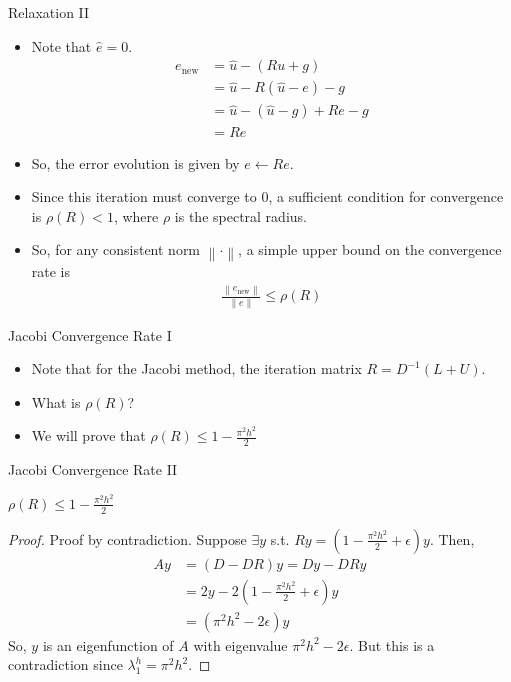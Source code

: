 \documentclass{beamer}
\providecommand{\norm}[1]{\left\lVert #1 \right\rVert}
\begin{document}
\begin{frame}{Relaxation II}
 \begin{itemize}
  \item Note that $\hat{e} = 0$.
  \begin{align}
   e_{\text{new}} &= \hat{u} - (Ru+g) \\
                  &= \hat{u} - R(\hat{u}-e) - g \\
                  &= \hat{u} - (\hat{u}-g) + Re - g \\
                  &= Re
  \end{align}
  \item So, the error evolution is given by $e \leftarrow Re$.
  \item Since this iteration must converge to 0, a sufficient condition for
        convergence is $\rho(R) < 1$, where $\rho$ is the spectral radius.
  \item So, for any consistent norm $\norm{\cdot}$, a simple upper bound on the convergence rate is
  \begin{align}
   \frac{\norm{e_{\text{new}}}}{\norm{e}} \leq \rho(R)
  \end{align}
 \end{itemize}
\end{frame}

\begin{frame}{Jacobi Convergence Rate I}
 \begin{itemize}
  \item Note that for the Jacobi method, the iteration matrix $R=D^{-1}(L+U)$.
  \item What is $\rho(R)$?
  \item We will prove that $\rho(R) \leq 1-\frac{\pi^2 h^2}{2}$
 \end{itemize}
\end{frame}

\begin{frame}{Jacobi Convergence Rate II}
 \begin{theorem}
  $\rho(R) \leq 1-\frac{\pi^2 h^2}{2}$
   
  \begin{proof}
   Proof by contradiction. Suppose $\exists y$ s.t. $Ry = (1-\frac{\pi^2 h^2}{2}+\epsilon)y$.
   Then,
   \begin{align}
    Ay &= (D-DR)y = Dy-DRy \nonumber \\
       &= 2y - 2(1-\frac{\pi^2 h^2}{2}+\epsilon)y \nonumber \\
       &= (\pi^2 h^2 - 2 \epsilon) y
   \end{align}
   So, $y$ is an eigenfunction of $A$ with eigenvalue $\pi^2 h^2 - 2 \epsilon$.
   But this is a contradiction since $\lambda^h_1 = \pi^2 h^2$.
  \end{proof}
 \end{theorem}
\end{frame}
\end{document}

